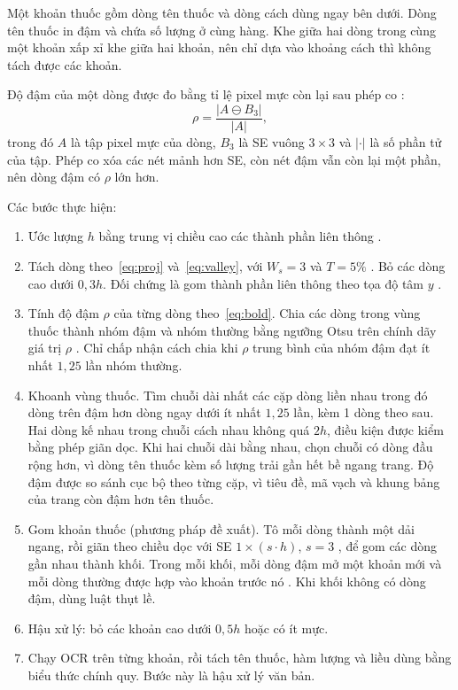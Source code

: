 Một khoản thuốc gồm dòng tên thuốc và dòng cách dùng ngay bên dưới.
Dòng tên thuốc in đậm và chứa số lượng ở cùng hàng.
Khe giữa hai dòng trong cùng một khoản xấp xỉ khe giữa hai khoản, nên chỉ dựa vào khoảng cách thì không tách được các khoản.

Độ đậm của một dòng được đo bằng tỉ lệ pixel mực còn lại sau phép co :
\begin{equation}\label{eq:bold}
  \rho=\frac{|A\ominus B_3|}{|A|},
\end{equation}
trong đó $A$ là tập pixel mực của dòng, $B_3$ là SE vuông $3\times3$ và $|\cdot|$ là số phần tử của tập.
Phép co xóa các nét mảnh hơn SE, còn nét đậm vẫn còn lại một phần, nên dòng đậm có $\rho$ lớn hơn.

Các bước thực hiện:
\begin{enumerate}
  \item Ước lượng $h$ bằng trung vị chiều cao các thành phần liên thông .
  \item Tách dòng theo~\eqref{eq:proj} và~\eqref{eq:valley}, với $W_s=3$ và $T=5\%$ .
        Bỏ các dòng cao dưới $0{,}3h$.
        Đối chứng là gom thành phần liên thông theo tọa độ tâm $y$ .
  \item Tính độ đậm $\rho$ của từng dòng theo~\eqref{eq:bold}.
        Chia các dòng trong vùng thuốc thành nhóm đậm và nhóm thường bằng ngưỡng Otsu trên chính dãy giá trị $\rho$ .
        Chỉ chấp nhận cách chia khi $\rho$ trung bình của nhóm đậm đạt ít nhất $1{,}25$ lần nhóm thường.
  \item Khoanh vùng thuốc.
        Tìm chuỗi dài nhất các cặp dòng liền nhau trong đó dòng trên đậm hơn dòng ngay dưới ít nhất $1{,}25$ lần, kèm 1 dòng theo sau.
        Hai dòng kế nhau trong chuỗi cách nhau không quá $2h$, điều kiện được kiểm bằng phép giãn dọc.
        Khi hai chuỗi dài bằng nhau, chọn chuỗi có dòng đầu rộng hơn, vì dòng tên thuốc kèm số lượng trải gần hết bề ngang trang.
        Độ đậm được so sánh cục bộ theo từng cặp, vì tiêu đề, mã vạch và khung bảng của trang còn đậm hơn tên thuốc.
  \item Gom khoản thuốc (phương pháp đề xuất).
        Tô mỗi dòng thành một dải ngang, rồi giãn theo chiều dọc với SE $1\times(s\cdot h)$, $s=3$ , để gom các dòng gần nhau thành khối.
        Trong mỗi khối, mỗi dòng đậm mở một khoản mới và mỗi dòng thường được hợp vào khoản trước nó .
        Khi khối không có dòng đậm, dùng luật thụt lề.
  \item Hậu xử lý: bỏ các khoản cao dưới $0{,}5h$ hoặc có ít mực.
  \item Chạy OCR trên từng khoản, rồi tách tên thuốc, hàm lượng và liều dùng bằng biểu thức chính quy.
        Bước này là hậu xử lý văn bản.
\end{enumerate}
